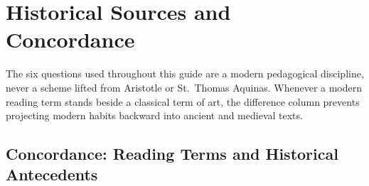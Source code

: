 \section{Historical Sources and Concordance}

The six questions used throughout this guide are a modern pedagogical discipline, never a scheme lifted from Aristotle or St.\ Thomas Aquinas. Whenever a modern reading term stands beside a classical term of art, the difference column prevents projecting modern habits backward into ancient and medieval texts.

\subsection{Concordance: Reading Terms and Historical Antecedents}

